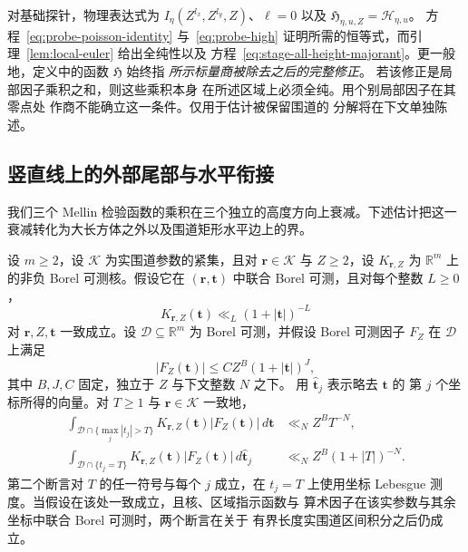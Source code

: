 对基础探针，物理表达式为
$I_\eta(Z^{l_x},Z^{l_y},Z)$、$\ell=0$ 以及
$\mathfrak H_{\eta,u,Z}=\mathcal H_{\eta,u}$。
方程~\eqref{eq:probe-poisson-identity} 与~\eqref{eq:probe-high}
证明所需的恒等式，而引理~\ref{lem:local-euler} 给出全纯性以及
方程~\eqref{eq:stage-all-height-majorant}。更一般地，定义中的函数
$\mathfrak H$ 始终指
\emph{所示标量商被除去之后的完整修正}。
若该修正是局部因子乘积之和，则这些乘积本身
在所述区域上必须全纯。用个别局部因子在其零点处
作商不能确立这一条件。仅用于估计被保留围道的
分解将在下文单独陈述。

\subsection{竖直线上的外部尾部与水平衔接}

我们三个 Mellin 检验函数的乘积在三个独立的高度方向上衰减。下述估计把这一
衰减转化为大长方体之外以及围道矩形水平边上的界。

\begin{lemma}[外部积分尾部与迹尾部]
\label{lem:external-contour-tails}
设 $m\ge2$，设 $\mathcal K$ 为实围道参数的紧集，且对 $\boldsymbol r\in\mathcal K$ 与
$Z\ge2$，设 $K_{\boldsymbol r,Z}$ 为 $\mathbb R^m$ 上的非负 Borel 可测核。假设它在
$(\boldsymbol r,\boldsymbol t)$ 中联合 Borel 可测，且对每个整数 $L\ge0$，
\[
 K_{\boldsymbol r,Z}(\boldsymbol t)
 \ll_L(1+|\boldsymbol t|)^{-L}
\]
对 $\boldsymbol r,Z,\boldsymbol t$ 一致成立。设
$\mathcal D\subseteq\mathbb R^m$ 为 Borel 可测，并假设 Borel
可测因子 $F_Z$ 在 $\mathcal D$ 上满足
\begin{equation}
 |F_Z(\boldsymbol t)|\le C Z^B(1+|\boldsymbol t|)^J,
 \label{eq:external-arithmetic-majorant}
\end{equation}
其中 $B,J,C$ 固定，独立于 $Z$ 与下文整数 $N$ 之下。
用 $\widehat{\boldsymbol t}_j$ 表示略去 $\boldsymbol t$ 的
第 $j$ 个坐标所得的向量。对 $T\ge1$ 与
$\boldsymbol r\in\mathcal K$ 一致地，
\begin{align}
 \int_{\mathcal D\cap\{\max_j|t_j|>T\}}
 K_{\boldsymbol r,Z}(\boldsymbol t)|F_Z(\boldsymbol t)|\,d\boldsymbol t
 &\ll_N Z^B T^{-N},
 \label{eq:external-integrated-tail}\\
 \int_{\mathcal D\cap\{t_j=T\}}
 K_{\boldsymbol r,Z}(\boldsymbol t)|F_Z(\boldsymbol t)|\,
 d\widehat{\boldsymbol t}_j
 &\ll_N Z^B(1+|T|)^{-N}.
 \label{eq:external-trace-tail}
\end{align}
第二个断言对 $T$ 的任一符号与每个 $j$ 成立，在 $t_j=T$ 上使用坐标
Lebesgue 测度。当假设在该处一致成立，且核、区域指示函数与
算术因子在该实参数与其余坐标中联合 Borel 可测时，两个断言在关于
有界长度实围道区间积分之后仍成立。
\end{lemma}


